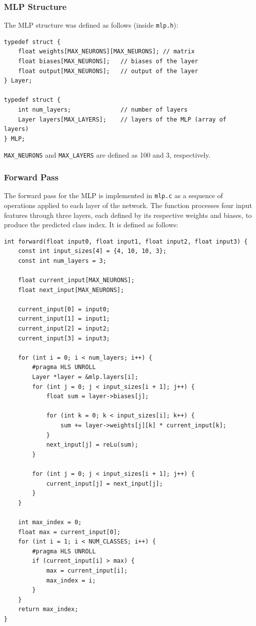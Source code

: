 \documentclass{article}
\begin{document}
\subsubsection{MLP Structure}
\label{sec:mlp-structure}
The MLP structure was defined as follows (inside \texttt{mlp.h}):
\begin{lstlisting}
typedef struct {
    float weights[MAX_NEURONS][MAX_NEURONS]; // matrix
    float biases[MAX_NEURONS];   // biases of the layer
    float output[MAX_NEURONS];   // output of the layer
} Layer;

typedef struct {
    int num_layers;              // number of layers
    Layer layers[MAX_LAYERS];    // layers of the MLP (array of layers)
} MLP;
\end{lstlisting}

\texttt{MAX\_NEURONS} and \texttt{MAX\_LAYERS} are defined as 100 and 3, respectively.

\subsubsection{Forward Pass}
The forward pass for the MLP is implemented in \texttt{mlp.c} as a sequence of operations applied to each layer of the network. The function processes four input features through three layers, each defined by its respective weights and biases, to produce the predicted class index.
It is defined as follows:
\begin{lstlisting}
int forward(float input0, float input1, float input2, float input3) {
    const int input_sizes[4] = {4, 10, 10, 3}; 
    const int num_layers = 3;

    float current_input[MAX_NEURONS];
    float next_input[MAX_NEURONS];

    current_input[0] = input0;
    current_input[1] = input1;
    current_input[2] = input2;
    current_input[3] = input3;

    for (int i = 0; i < num_layers; i++) {
        #pragma HLS UNROLL
        Layer *layer = &mlp.layers[i];
        for (int j = 0; j < input_sizes[i + 1]; j++) {
            float sum = layer->biases[j];
            
            for (int k = 0; k < input_sizes[i]; k++) {
                sum += layer->weights[j][k] * current_input[k];
            }
            next_input[j] = reLu(sum);
        }

        for (int j = 0; j < input_sizes[i + 1]; j++) {
            current_input[j] = next_input[j];
        }
    }

    int max_index = 0;
    float max = current_input[0];
    for (int i = 1; i < NUM_CLASSES; i++) {
        #pragma HLS UNROLL
        if (current_input[i] > max) {
            max = current_input[i];
            max_index = i;
        }
    }
    return max_index;
}
\end{lstlisting}
\end{document}
